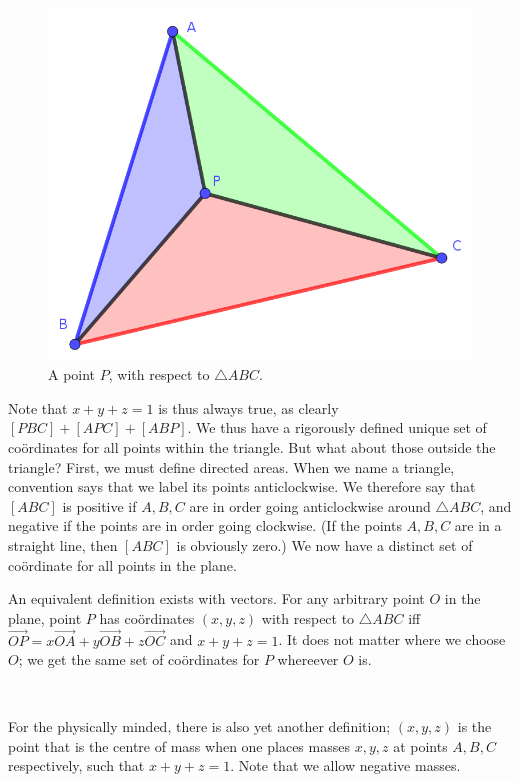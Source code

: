 \begin{figure}[h]
	\centering
	\includegraphics[width=0.5\linewidth]{def-areas}
	\caption{A point \(P\), with respect to \(\triangle{}ABC\).}
	\label{def-areas}
\end{figure}

\begin{multicols}{2}

Note that \(x+y+z=1\) is thus always true, as clearly \([PBC]+[APC]+[ABP]\). We thus have a rigorously defined unique set of co\"ordinates for all points within the triangle. But what about those outside the triangle? First, we must define directed areas. When we name a triangle, convention says that we label its points anticlockwise. We therefore say that \([ABC]\) is positive if \(A,B,C\) are in order going anticlockwise around \(\triangle{}ABC\), and negative if the points are in order going clockwise. (If the points \(A,B,C\) are in a straight line, then \([ABC]\) is obviously zero.) We now have a distinct set of co\"ordinate for all points in the plane. 

An equivalent definition exists with vectors. For any arbitrary point \(O\) in the plane, point \(P\) has co\"ordinates \((x,y,z)\) with respect to \(\triangle{}ABC\) iff \(\overrightarrow{OP}=x\overrightarrow{OA}+y\overrightarrow{OB}+z\overrightarrow{OC}\) and \(x+y+z=1\). It does not matter where we choose \(O\); we get the same set of co\"ordinates for \(P\) whereever \(O\) is. 

\begin{center}
\\
\end{center}

For the physically minded, there is also yet another definition; \((x,y,z)\) is the point that is the centre of mass when one places masses \(x,y,z\) at points \(A,B,C\) respectively, such that \(x+y+z=1\). Note that we allow negative masses.


\end{multicols}
